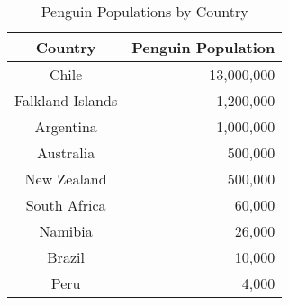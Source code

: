 \begin{table}[htbp]
\centering
\renewcommand{\arraystretch}{1.2} %
\setlength{\tabcolsep}{12pt} %
\begin{tabular}{|c|r|}
\hline
\textbf{Country} & \textbf{Penguin Population} \\ \hline
Chile            & 13,000,000                  \\ \hline
Falkland Islands & 1,200,000                   \\ \hline
Argentina        & 1,000,000                   \\ \hline
Australia        & 500,000                     \\ \hline
New Zealand      & 500,000                     \\ \hline
South Africa     & 60,000                      \\ \hline
Namibia          & 26,000                      \\ \hline
Brazil           & 10,000                      \\ \hline
Peru             & 4,000                       \\ \hline
\end{tabular}
\caption{Penguin Populations by Country}
\label{tab:penguins}
\end{table}
